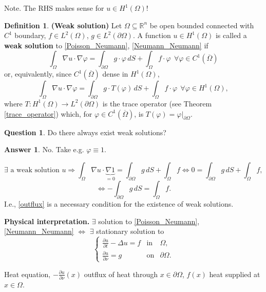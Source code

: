 \documentclass[12pt]{article}
\theoremstyle{definition}
\newtheorem{definition}{Definition}[section]
\newtheorem*{question}{Question}
\newtheorem*{answer}{Answer}
\begin{document}
Note. The RHS makes sense for $u\in H^1(\Omega)$!

\begin{definition}
\textbf{(Weak solution)} Let $\Omega\subseteq\mathbb{R}^n$ be open bounded connected with $C^1$ boundary, $f\in L^2(\Omega)$, $g\in L^2(\partial\Omega)$. A function $u\in H^1(\Omega)$ is called a \textbf{weak solution} to \eqref{Poisson_Neumann}, \eqref{Neumann_Neumann} if
\[\int_{\Omega}\nabla u\cdot\nabla\varphi=\int_{\partial\Omega}g\cdot\varphi\,dS+\int_{\Omega}f\cdot\varphi\ \ \forall\varphi\in C^1(\overline{\Omega})\]
or, equivalently, since $C^1(\overline{\Omega})$ dense in $H^1(\Omega)$,
\[\int_{\Omega}\nabla u\cdot\nabla\varphi=\int_{\partial\Omega}g\cdot T(\varphi)\,dS+\int_{\Omega}f\cdot\varphi\ \ \forall\varphi\in H^1(\Omega),\]
where $T:H^1(\Omega)\rightarrow L^2(\partial\Omega)$ is the trace operator (see Theorem \ref{trace_operator}) which, for $\varphi\in C^1(\overline{\Omega})$, is $T(\varphi)=\varphi|_{\partial\Omega}$.
\end{definition}

\begin{question}
Do there always exist weak solutions?
\end{question}

\begin{answer}
No. Take e.g. $\varphi\equiv1$.

\[\exists\text{ a weak solution }u\Longrightarrow\int_{\Omega}\nabla u\cdot\underbrace{\nabla1}_{=0}=\int_{\partial\Omega}g\,dS+\int_{\Omega}f\Longleftrightarrow0=\int_{\partial\Omega}g\,dS+\int_{\Omega}f,\]
\begin{equation}\tag{$*$}\label{outflux}
\Longleftrightarrow-\int_{\partial\Omega}g\,dS=\int_{\Omega}f.
\end{equation}
I.e., \eqref{outflux} is a necessary condition for the existence of weak solutions.
\end{answer}

\textbf{Physical interpretation.} $\exists$ solution to \eqref{Poisson_Neumann}, \eqref{Neumann_Neumann} $\Leftrightarrow$ $\exists$ stationary solution to
\[\left\{\begin{array}{rcl}\displaystyle{\frac{\partial u}{\partial t}-\Delta u=f}&\text{in}&\Omega,\\\displaystyle{\frac{\partial u}{\partial\nu}=g}&\text{on}&\partial\Omega.\end{array}\right.\]

Heat equation, $-\frac{\partial u}{\partial\nu}(x)$ outflux of heat through $x\in\partial\Omega$, $f(x)$ heat supplied at $x\in\Omega$.
\end{document}
